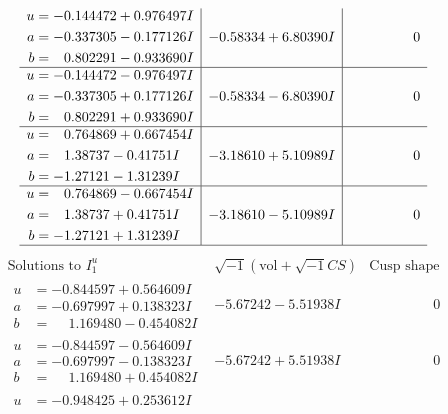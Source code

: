 \documentclass[1p]{elsarticle_modified}
\theoremstyle{definition}
\newcommand{\I}{\sqrt{-1}}
\begin{document}
$$\begin{array}{c|c|c}
\begin{aligned}
u &= -0.144472 + 0.976497 I \\
a &= -0.337305 - 0.177126 I \\
b &= \phantom{-}0.802291 - 0.933690 I\end{aligned}
 & -0.58334 + 6.80390 I & \phantom{-0.000000 } 0 \\ \hline\begin{aligned}
u &= -0.144472 - 0.976497 I \\
a &= -0.337305 + 0.177126 I \\
b &= \phantom{-}0.802291 + 0.933690 I\end{aligned}
 & -0.58334 - 6.80390 I & \phantom{-0.000000 } 0 \\ \hline\begin{aligned}
u &= \phantom{-}0.764869 + 0.667454 I \\
a &= \phantom{-}1.38737 - 0.41751 I \\
b &= -1.27121 - 1.31239 I\end{aligned}
 & -3.18610 + 5.10989 I & \phantom{-0.000000 } 0 \\ \hline\begin{aligned}
u &= \phantom{-}0.764869 - 0.667454 I \\
a &= \phantom{-}1.38737 + 0.41751 I \\
b &= -1.27121 + 1.31239 I\end{aligned}
 & -3.18610 - 5.10989 I & \phantom{-0.000000 } 0\\
 \hline 
 \end{array}$$\newpage$$\begin{array}{c|c|c}  
\text{Solutions to }I^u_{1}& \I (\text{vol} + \sqrt{-1}CS) & \text{Cusp shape}\\
 \hline 
\begin{aligned}
u &= -0.844597 + 0.564609 I \\
a &= -0.697997 + 0.138323 I \\
b &= \phantom{-}1.169480 - 0.454082 I\end{aligned}
 & -5.67242 - 5.51938 I & \phantom{-0.000000 } 0 \\ \hline\begin{aligned}
u &= -0.844597 - 0.564609 I \\
a &= -0.697997 - 0.138323 I \\
b &= \phantom{-}1.169480 + 0.454082 I\end{aligned}
 & -5.67242 + 5.51938 I & \phantom{-0.000000 } 0 \\ \hline\begin{aligned}
u &= -0.948425 + 0.253612 I \\

\end{aligned}
\end{array}$$
\end{document}

